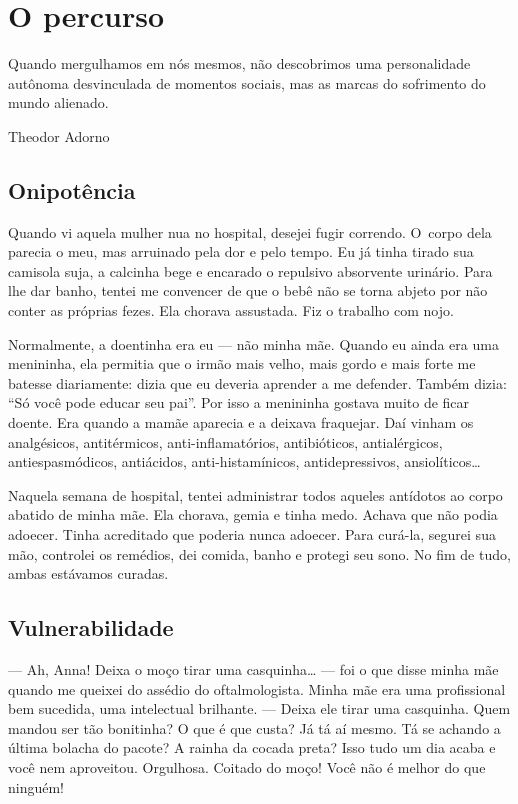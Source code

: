 \part{O percurso} 

\epigraph{Quando mergulhamos em nós mesmos, não descobrimos uma personalidade
autônoma desvinculada de momentos sociais, mas as marcas do sofrimento
do mundo alienado.}{Theodor Adorno} 

\chapter{Onipotência}

Quando vi aquela mulher nua no hospital, desejei fugir correndo. O~corpo
dela parecia o meu, mas arruinado pela dor e pelo tempo. Eu já tinha
tirado sua camisola suja, a calcinha bege e encarado o repulsivo
absorvente urinário. Para lhe dar banho, tentei me convencer de que o
bebê não se torna abjeto por não conter as próprias fezes. Ela chorava
assustada. Fiz o trabalho com nojo.

Normalmente, a doentinha era eu --- não minha mãe. Quando eu ainda era
uma menininha, ela permitia que o irmão mais velho, mais gordo e mais
forte me batesse diariamente: dizia que eu deveria aprender a me
defender. Também dizia: ``Só você pode educar seu pai''. Por isso a
menininha gostava muito de ficar doente. Era quando a mamãe aparecia e a
deixava fraquejar. Daí vinham os analgésicos, antitérmicos,
anti-inflamatórios, antibióticos, antialérgicos, antiespasmódicos,
antiácidos, anti-histamínicos, antidepressivos, ansiolíticos…

Naquela semana de hospital, tentei administrar todos aqueles antídotos
ao corpo abatido de minha mãe. Ela chorava, gemia e tinha medo. Achava
que não podia adoecer. Tinha acreditado que poderia nunca adoecer. Para
curá-la, segurei sua mão, controlei os remédios, dei comida, banho e
protegi seu sono. No fim de tudo, ambas estávamos curadas.

\chapter{Vulnerabilidade}

\mbox{}\indent{}--- Ah, Anna! Deixa o moço tirar uma casquinha… --- foi o que
disse minha mãe quando me queixei do assédio do oftalmologista. Minha
mãe era uma profissional bem sucedida, uma intelectual brilhante. ---
Deixa ele tirar uma casquinha. Quem mandou ser tão bonitinha? O que é
que custa? Já tá aí mesmo. Tá se achando a última bolacha do pacote? A
rainha da cocada preta? Isso tudo um dia acaba e você nem aproveitou.
Orgulhosa. Coitado do moço! Você não é melhor do que ninguém!

